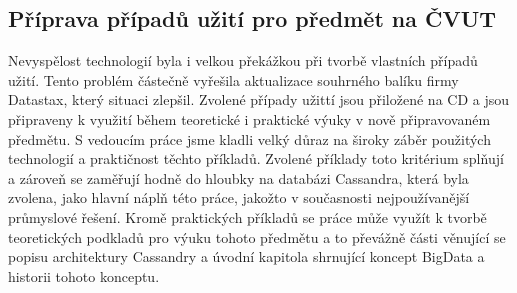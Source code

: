 \subsection{Příprava případů užití pro předmět na ČVUT}
Nevyspělost technologií byla i velkou překážkou při tvorbě vlastních případů užití. Tento problém částečně vyřešila aktualizace souhrného balíku firmy Datastax, který situaci zlepšil. Zvolené případy užittí jsou přiložené na CD a jsou připraveny k využití během teoretické i praktické výuky v nově připravovaném předmětu. S vedoucím práce jsme kladli velký důraz na široky záběr použitých technologií a praktičnost těchto příkladů. Zvolené příklady toto kritérium splňují a zároveň se zaměřují hodně do hloubky na databázi Cassandra, která byla zvolena, jako hlavní náplň této práce, jakožto v současnosti nejpoužívanější průmyslové řešení. Kromě praktických příkladů se práce může využít k tvorbě teoretických podkladů pro výuku tohoto předmětu a to převážně části věnující se popisu architektury Cassandry a úvodní kapitola shrnující koncept BigData a historii tohoto konceptu. 